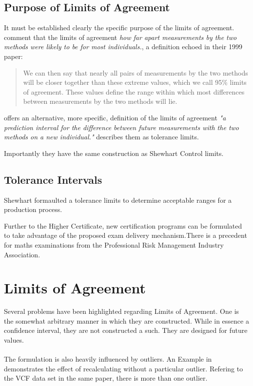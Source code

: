 \documentclass[12pt, a4paper]{article}
\begin{document}
\subsection{Purpose of Limits of Agreement} It must be established
clearly the specific purpose of the limits of agreement.
\citet*{BA95} comment that the limits of agreement \emph{how far
apart measurements by the two methods were likely to be for most
individuals.}, a definition echoed in their 1999 paper:
\begin{quote} We can then say that nearly all pairs
of measurements by the two methods will be closer together than
these extreme values, which we call 95\% limits of agreement.
These values define the range within which most differences
between measurements by the two methods will lie\citep{BA99}.
\end{quote}
\citet{BXC} offers an alternative, more specific,  definition of
the limits of agreement \emph{"a prediction interval for the
difference between future measurements with the two methods on a
new individual."} \citet{luiz} describes them as tolerance limits.

Importantly they have the same construction as Shewhart Control
limits.
\subsection{Tolerance Intervals}

Shewhart formaulted a tolerance limits to determine acceptable
ranges for a production process.

Further to the Higher Certificate, new certification programs can
be formulated to take advantage of the proposed exam delivery
mechanism\citep*{BB}.There is a precedent for maths examinations
from the Professional Risk Management Industry Association.


\section{Limits of Agreement}

Several problems have been highlighted regarding Limits of
Agreement. One is the somewhat arbitrary manner in which they are
constructed. While in essence a confidence interval, they are not
constructed a such. They are designed for future values.
\\
\\
The formulation is also heavily influenced by outliers. An Example
in \citet*{BA83} demonstrates the effect of recalculating without
a particular outlier. Refering to the VCF data set in the same
paper, there is more than one outlier.
\end{document}
